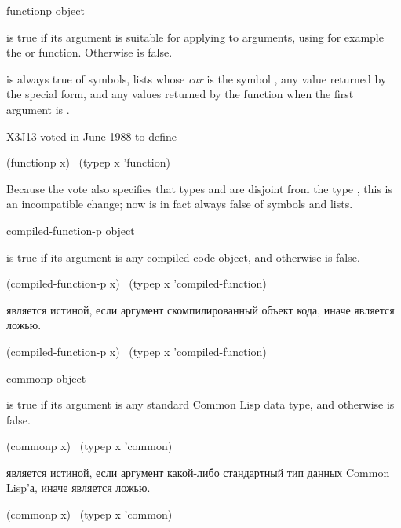 \begin{defun}[Function]
functionp object

\begin{obsolete}
 is true if its argument is suitable for applying
to arguments, using for example the  or  function.
Otherwise  is false.

 is always true of symbols, lists whose \emph{car}
is the symbol , any value returned by the 
special form, and any values returned by the function 
when the first argument is {\nil}.
\end{obsolete}
\begin{newer}
X3J13 voted in June 1988 
to define
\begin{lisp}
(functionp x) \EQ\ (typep x 'function)
\end{lisp}
Because the vote also specifies that types  and  are disjoint
from the type , this is an incompatible change;
now  is in fact always false of symbols and lists.
\end{newer}
\end{defun}

\begin{defun}[Function]
compiled-function-p object

 is true if its argument is any compiled code object,
and otherwise is false.
\begin{lisp}
(compiled-function-p x) \EQ\ (typep x 'compiled-function)
\end{lisp}

 является истиной, если аргумент скомпилированный
объект кода,  иначе является ложью.
\begin{lisp}
(compiled-function-p x) \EQ\ (typep x 'compiled-function)
\end{lisp}
\end{defun}

\begin{obsolete}
\begin{defun}[Function]
commonp object

 is true if its argument is any standard Common Lisp data type,
and otherwise is false.
\begin{lisp}
(commonp x) \EQ\ (typep x 'common)
\end{lisp}

 является истиной, если аргумент какой-либо стандартный тип данных
Common Lisp'а, иначе является ложью.
\begin{lisp}
(commonp x) \EQ\ (typep x 'common)
\end{lisp}
\end{defun}
\end{obsolete}

